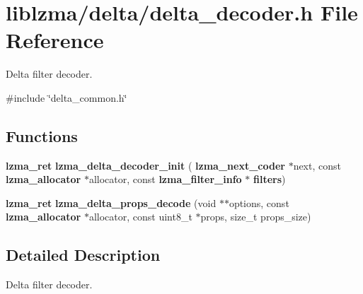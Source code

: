 \section{liblzma/delta/delta\+\_\+decoder.h File Reference}
\label{delta__decoder_8h}


Delta filter decoder.  


{\ttfamily \#include \char`\"{}delta\+\_\+common.\+h\char`\"{}}\newline
\subsection*{Functions}
\begin{DoxyCompactItemize}
\item 
\mbox{\label{delta__decoder_8h_ac9375bb1064c5b6937486dc52fb3bdff}} 
\textbf{ lzma\+\_\+ret} {\bfseries lzma\+\_\+delta\+\_\+decoder\+\_\+init} (\textbf{ lzma\+\_\+next\+\_\+coder} $\ast$next, const \textbf{ lzma\+\_\+allocator} $\ast$allocator, const \textbf{ lzma\+\_\+filter\+\_\+info} $\ast$\textbf{ filters})
\item 
\mbox{\label{delta__decoder_8h_a6a5d57421d63f10a659762b2938ff31d}} 
\textbf{ lzma\+\_\+ret} {\bfseries lzma\+\_\+delta\+\_\+props\+\_\+decode} (void $\ast$$\ast$options, const \textbf{ lzma\+\_\+allocator} $\ast$allocator, const uint8\+\_\+t $\ast$props, size\+\_\+t props\+\_\+size)
\end{DoxyCompactItemize}


\subsection{Detailed Description}
Delta filter decoder. 


